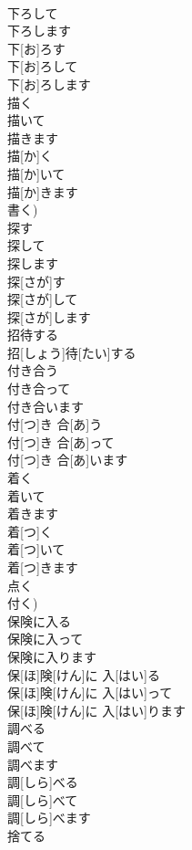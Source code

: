 \documentclass[8pt]{extreport}
\begin{document}
\begin{CJK}{UTF8}{min}
\\	下ろして 
\\	下ろします	
\\	下[お]ろす 
\\	下[お]ろして 
\\	下[お]ろします	
\\	描く 
\\	描いて 
\\	描きます	
\\	描[か]く 
\\	描[か]いて 
\\	描[か]きます 
\\	書く)	
\\	探す 
\\	探して 
\\	探します	
\\	探[さが]す 
\\	探[さが]して 
\\	探[さが]します	
\\	招待する	
\\	招[しょう]待[たい]する	
\\	付き合う 
\\	付き合って 
\\	付き合います	
\\	付[つ]き 合[あ]う 
\\	付[つ]き 合[あ]って 
\\	付[つ]き 合[あ]います	
\\	着く 
\\	着いて 
\\	着きます	
\\	着[つ]く 
\\	着[つ]いて 
\\	着[つ]きます 
\\	点く 
\\	付く)	
\\	保険に入る 
\\	保険に入って 
\\	保険に入ります	
\\	保[ほ]険[けん]に 入[はい]る 
\\	保[ほ]険[けん]に 入[はい]って 
\\	保[ほ]険[けん]に 入[はい]ります	
\\	調べる 
\\	調べて 
\\	調べます	
\\	調[しら]べる 
\\	調[しら]べて 
\\	調[しら]べます	
\\	捨てる 

\end{CJK}
\end{document}
